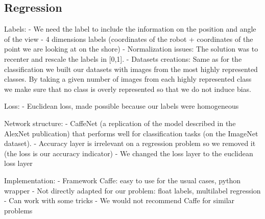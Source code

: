 \subsection{Regression}
Labels:
- We need the label to include the information on the position and angle of the view
- 4 dimensions labels (coordinates of the robot + coordinates of the point we are looking at on the shore)
- Normalization issues: The solution was to recenter and rescale the labels in [0,1].
- Datasets creations: Same as for the classification we built our datasets with images from the most highly represented classes. By taking a given number of images from each highly represented class we make sure that no class is overly represented so that we do not induce bias.

Loss:
- Euclidean loss, made possible because our labels were homogeneous

Network structure: 
- CaffeNet (a replication of the model described in the AlexNet publication) that performs well for classification tasks (on the ImageNet dataset).
- Accuracy layer is irrelevant on a regression problem so we removed it (the loss is our accuracy indicator)
- We changed the loss layer to the euclidean loss layer

Implementation:
- Framework Caffe: easy to use for the usual cases, python wrapper
- Not directly adapted for our problem: float labels, multilabel regression
- Can work with some tricks
- We would not recommend Caffe for similar problems